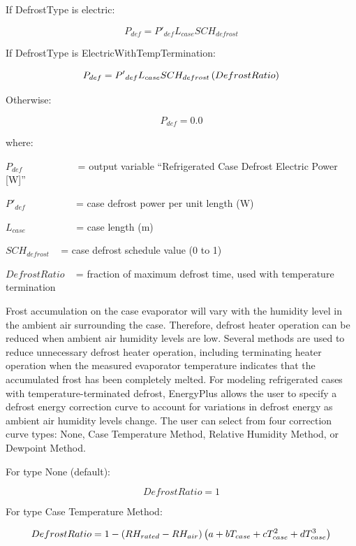 If DefrostType is electric:

\begin{equation}
  P_{def} = {P'}_{def} L_{case} SCH_{defrost} 
\end{equation}

If DefrostType is ElectricWithTempTermination:

\begin{equation}
  P_{def} = {P'}_{def} L_{case} SCH_{defrost} \left(DefrostRatio\right)
\end{equation}

Otherwise:

\begin{equation}
  P_{def} = 0.0
\end{equation}

where:

\({P_{def}}\) ~~~~~~~~~~ = output variable ``Refrigerated Case Defrost Electric Power {[}W{]}''

\({P'}_{def}\) ~~~~~~~~~ = case defrost power per unit length (W)

\({L_{case}}\) ~~~~~~~~~ = case length (m)

\(SC{H_{defrost}}\) ~ = case defrost schedule value (0 to 1)

\(DefrostRatio\) ~ = fraction of maximum defrost time, used with temperature termination

Frost accumulation on the case evaporator will vary with the humidity level in the ambient air surrounding the case. Therefore, defrost heater operation can be reduced when ambient air humidity levels are low. Several methods are used to reduce unnecessary defrost heater operation, including terminating heater operation when the measured evaporator temperature indicates that the accumulated frost has been completely melted. For modeling refrigerated cases with temperature-terminated defrost, EnergyPlus allows the user to specify a defrost energy correction curve to account for variations in defrost energy as ambient air humidity levels change. The user can select from four correction curve types: None, Case Temperature Method, Relative Humidity Method, or Dewpoint Method.

For type None (default):

\begin{equation}
  DefrostRatio = 1
\end{equation}

For type Case Temperature Method:

\begin{equation}
  DefrostRatio = 1 - \left(RH_{rated} - RH_{air}\right) \left(a + b T_{case} + c T_{case}^2 + d T_{case}^3\right)
\end{equation}

